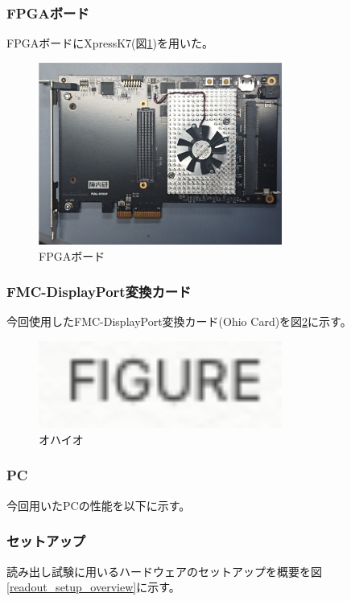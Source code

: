 \subsubsection{FPGAボード}

FPGAボードにXpressK7\cite{2}(図\ref{demo_fpga_board})を用いた。
\begin{figure}[h]\centering
\includegraphics[width=8cm]{fpga_board}
\caption[FPGAボード]{FPGAボード}
\label{demo_fpga_board}
\end{figure}

\subsubsection{FMC-DisplayPort変換カード}

今回使用したFMC-DisplayPort変換カード(Ohio Card)を図\ref{demo_ohio}に示す。
\begin{figure}[h]\centering
\includegraphics[width=8cm]{figure}
\caption[オハイオ]{オハイオ}
\label{demo_ohio}
\end{figure}

\subsubsection{PC}
今回用いたPCの性能を以下に示す。

\subsubsection{セットアップ}
読み出し試験に用いるハードウェアのセットアップを概要を図\ref{readout_setup_overview}に示す。

